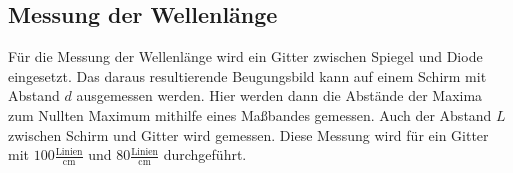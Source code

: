 \subsection*{Messung der Wellenlänge}
Für die Messung der Wellenlänge wird ein Gitter zwischen Spiegel und Diode eingesetzt.
Das daraus resultierende Beugungsbild kann auf einem Schirm mit Abstand $d$ ausgemessen werden.
Hier werden dann die Abstände der Maxima zum Nullten Maximum mithilfe eines Maßbandes gemessen.
Auch der Abstand $L$ zwischen Schirm und Gitter wird gemessen.
Diese Messung wird für ein Gitter mit $100 \frac{\text{Linien}}{\unit{\centi\meter}}$ und $80 \frac{\text{Linien}}{\unit{\centi\meter}}$ durchgeführt.